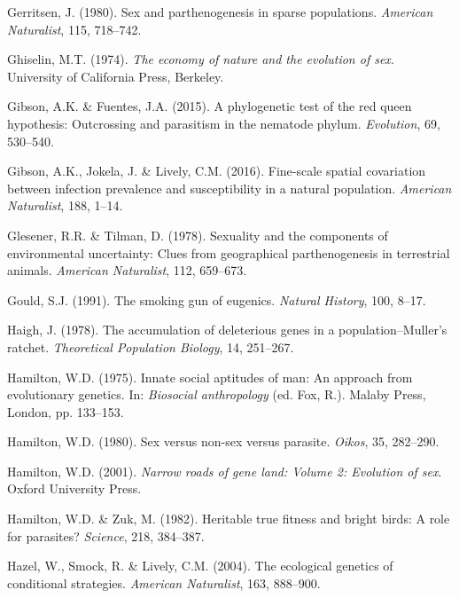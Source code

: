 \documentclass[
  letterpaper,
]{book}
\newlength{\cslhangindent}
\newenvironment{CSLReferences}[2] %
 {\begin{list}{}{%
  \setlength{\itemindent}{0pt}
  \setlength{\leftmargin}{0pt}
  \setlength{\parsep}{0pt}
  \ifodd #1
   \setlength{\leftmargin}{\cslhangindent}
   \setlength{\itemindent}{-1\cslhangindent}
  \fi
  \setlength{\itemsep}{#2\baselineskip}}}
 {\end{list}}
\begin{document}
\begin{CSLReferences}{1}{0}
Gerritsen, J. (1980). Sex and parthenogenesis in sparse populations.
\emph{American Naturalist}, 115, 718--742.

Ghiselin, M.T. (1974). \emph{The economy of nature and the evolution of
sex}. University of California Press, Berkeley.

Gibson, A.K. \& Fuentes, J.A. (2015). A phylogenetic test of the red
queen hypothesis: Outcrossing and parasitism in the nematode phylum.
\emph{Evolution}, 69, 530--540.

Gibson, A.K., Jokela, J. \& Lively, C.M. (2016). Fine-scale spatial
covariation between infection prevalence and susceptibility in a natural
population. \emph{American Naturalist}, 188, 1--14.

Glesener, R.R. \& Tilman, D. (1978). Sexuality and the components of
environmental uncertainty: Clues from geographical parthenogenesis in
terrestrial animals. \emph{American Naturalist}, 112, 659--673.

Gould, S.J. (1991). The smoking gun of eugenics. \emph{Natural History},
100, 8--17.

Haigh, J. (1978). The accumulation of deleterious genes in a
population--{Muller's} ratchet. \emph{Theoretical Population Biology},
14, 251--267.

Hamilton, W.D. (1975). Innate social aptitudes of man: An approach from
evolutionary genetics. In: \emph{Biosocial anthropology} (ed. Fox, R.).
Malaby Press, London, pp. 133--153.

Hamilton, W.D. (1980). Sex versus non-sex versus parasite. \emph{Oikos},
35, 282--290.

Hamilton, W.D. (2001). \emph{Narrow roads of gene land: Volume 2:
Evolution of sex}. Oxford University Press.

Hamilton, W.D. \& Zuk, M. (1982). Heritable true fitness and bright
birds: A role for parasites? \emph{Science}, 218, 384--387.

Hazel, W., Smock, R. \& Lively, C.M. (2004). The ecological genetics of
conditional strategies. \emph{American Naturalist}, 163, 888--900.


\end{CSLReferences}
\end{document}

